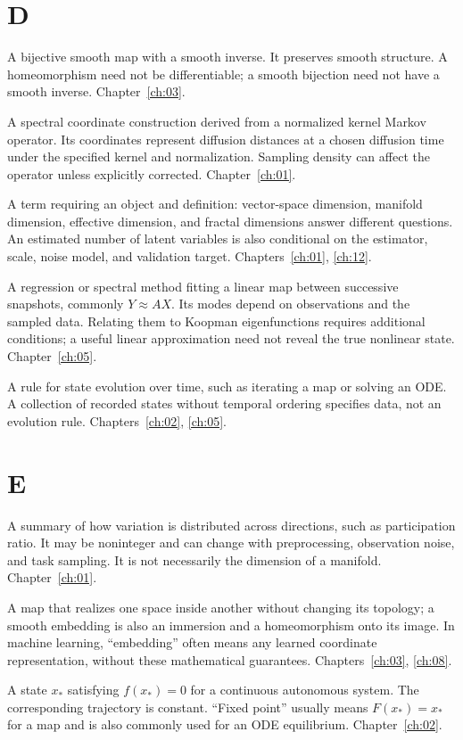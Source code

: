 \section*{D}
\begin{description}[style=nextline]
\item[Diffeomorphism.] A bijective smooth map with a smooth inverse. It preserves smooth structure. A homeomorphism need not be differentiable; a smooth bijection need not have a smooth inverse. Chapter~\ref{ch:03}.
\item[Diffusion map.] A spectral coordinate construction derived from a normalized kernel Markov operator. Its coordinates represent diffusion distances at a chosen diffusion time under the specified kernel and normalization. Sampling density can affect the operator unless explicitly corrected. Chapter~\ref{ch:01}.
\item[Dimension.] A term requiring an object and definition: vector-space dimension, manifold dimension, effective dimension, and fractal dimensions answer different questions. An estimated number of latent variables is also conditional on the estimator, scale, noise model, and validation target. Chapters~\ref{ch:01}, \ref{ch:12}.
\item[Dynamical mode decomposition (DMD).] A regression or spectral method fitting a linear map between successive snapshots, commonly $Y\approx AX$. Its modes depend on observations and the sampled data. Relating them to Koopman eigenfunctions requires additional conditions; a useful linear approximation need not reveal the true nonlinear state. Chapter~\ref{ch:05}.
\item[Dynamical system.] A rule for state evolution over time, such as iterating a map or solving an ODE. A collection of recorded states without temporal ordering specifies data, not an evolution rule. Chapters~\ref{ch:02}, \ref{ch:05}.
\end{description}

\section*{E}
\begin{description}[style=nextline]
\item[Effective dimension.] A summary of how variation is distributed across directions, such as participation ratio. It may be noninteger and can change with preprocessing, observation noise, and task sampling. It is not necessarily the dimension of a manifold. Chapter~\ref{ch:01}.
\item[Embedding.] A map that realizes one space inside another without changing its topology; a smooth embedding is also an immersion and a homeomorphism onto its image. In machine learning, ``embedding'' often means any learned coordinate representation, without these mathematical guarantees. Chapters~\ref{ch:03}, \ref{ch:08}.
\item[Equilibrium.] A state $x_*$ satisfying $f(x_*)=0$ for a continuous autonomous system. The corresponding trajectory is constant. ``Fixed point'' usually means $F(x_*)=x_*$ for a map and is also commonly used for an ODE equilibrium. Chapter~\ref{ch:02}.
\end{description}

